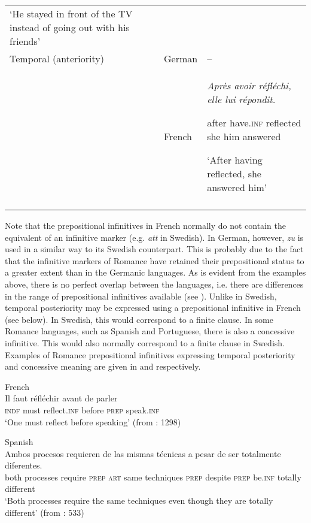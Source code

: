 \documentclass[output=paper]{langscibook}
\begin{document}
\begin{table}
\begin{tabularx}{\textwidth}{p{2cm}lQ}
‘He stayed in front of the TV instead of going out with his friends’ \\

\tablevspace
Temporal (anteriority) & German & –\\
& French & \textit{Après   avoir     réfléchi,   elle   lui   répondit.}

after   have.\textsc{inf}   reflected   she   him   answered

‘After having reflected, she answered him’\\

\lspbottomrule
\end{tabularx}
\end{table}


Note that the prepositional infinitives in French normally do not contain the equivalent of an infinitive marker (e.g. \textit{att} in Swedish). In German, however, \textit{zu} is used in a similar way to its Swedish counterpart. This is probably due to the fact that the infinitive markers of Romance have retained their prepositional status to a greater extent than in the Germanic languages. As is evident from the examples above, there is no perfect overlap between the languages, i.e. there are differences in the range of prepositional infinitives available (see \citealt{Hengenveld1998}). Unlike in Swedish, temporal posteriority may be expressed using a prepositional infinitive in French (see  below). In Swedish, this would correspond to a finite clause. In some Romance languages, such as Spanish and Portuguese, there is also a concessive infinitive. This would also normally correspond to a finite clause in Swedish. Examples of Romance prepositional infinitives expressing temporal posteriority and concessive meaning are given in  and  respectively. 


\ea
\label{ex:kalm:5}
\ea French\label{ex:kalm:5a}\\ 
\gll Il faut réfléchir avant de parler\\
\textsc{indf} must reflect.\textsc{inf} before \textsc{prep} speak.\textsc{inf}\\
\glt ‘One must reflect before speaking’ (from \citealt{Grevisse1993}: 1298) 

\ex Spanish\label{ex:kalm:5b}\\ 
\gll Ambos procesos requieren de las mismas técnicas a pesar de ser totalmente diferentes.\\
both processes require \textsc{prep} \textsc{art} same techniques \textsc{prep} despite \textsc{prep} be.\textsc{inf} totally different\\
\glt ‘Both processes require the same techniques even though they are totally different’ (from \citealt{Schulte2007What}: 533)
\z 
\z 
\end{document}
